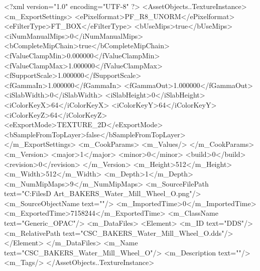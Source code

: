 <?xml version="1.0" encoding="UTF-8" ?>
<AssetObjects..TextureInstance>
	<m_ExportSettings>
		<ePixelformat>PF_R8_UNORM</ePixelformat>
		<eFilterType>FT_BOX</eFilterType>
		<bUseMips>true</bUseMips>
		<iNumManualMips>0</iNumManualMips>
		<bCompleteMipChain>true</bCompleteMipChain>
		<fValueClampMin>0.000000</fValueClampMin>
		<fValueClampMax>1.000000</fValueClampMax>
		<fSupportScale>1.000000</fSupportScale>
		<fGammaIn>1.000000</fGammaIn>
		<fGammaOut>1.000000</fGammaOut>
		<iSlabWidth>0</iSlabWidth>
		<iSlabHeight>0</iSlabHeight>
		<iColorKeyX>64</iColorKeyX>
		<iColorKeyY>64</iColorKeyY>
		<iColorKeyZ>64</iColorKeyZ>
		<eExportMode>TEXTURE_2D</eExportMode>
		<bSampleFromTopLayer>false</bSampleFromTopLayer>
	</m_ExportSettings>
	<m_CookParams>
		<m_Values/>
	</m_CookParams>
	<m_Version>
		<major>1</major>
		<minor>0</minor>
		<build>0</build>
		<revision>0</revision>
	</m_Version>
	<m_Height>512</m_Height>
	<m_Width>512</m_Width>
	<m_Depth>1</m_Depth>
	<m_NumMipMaps>9</m_NumMipMaps>
	<m_SourceFilePath text="C:\Users\Shadow\Desktop\Working Files\3D Art\Textures\CSC_BAKERS_Water_Mill_Wheel_O.png"/>
	<m_SourceObjectName text=""/>
	<m_ImportedTime>0</m_ImportedTime>
	<m_ExportedTime>7158244</m_ExportedTime>
	<m_ClassName text="Generic_OPAC"/>
	<m_DataFiles>
		<Element>
			<m_ID text="DDS"/>
			<m_RelativePath text="CSC_BAKERS_Water_Mill_Wheel_O.dds"/>
		</Element>
	</m_DataFiles>
	<m_Name text="CSC_BAKERS_Water_Mill_Wheel_O"/>
	<m_Description text=""/>
	<m_Tags/>
</AssetObjects..TextureInstance>

